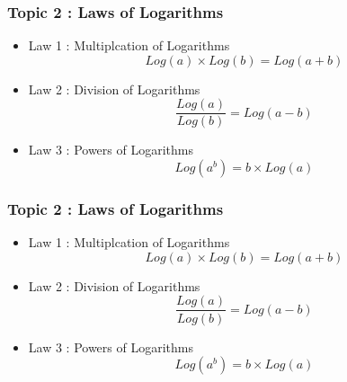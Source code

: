 \documentclass{beamer}
\begin{document}
\begin{frame}
	\frametitle{ Topic 2 : Laws of Logarithms}
	\Large
	\begin{itemize}
		\item Law 1 : Multiplcation of Logarithms
		\[ Log(a) \times Log(b) = Log(a+b) \]
		\item Law 2 : Division of Logarithms
		\[ \frac{Log(a)}{Log(b)} = Log(a-b) \]
		\item Law 3 : Powers of Logarithms
		\[ Log(a^b) = b \times Log(a) \]
	\end{itemize}
	
	
	
\end{frame}

\begin{frame}
	\frametitle{ Topic 2 : Laws of Logarithms}
	\Large
	\begin{itemize}
		\item Law 1 : Multiplcation of Logarithms
		\[ Log(a) \times Log(b) = Log(a+b) \]
		\item Law 2 : Division of Logarithms
		\[ \frac{Log(a)}{Log(b)} = Log(a-b) \]
		\item Law 3 : Powers of Logarithms
		\[ Log(a^b) = b \times Log(a) \]
	\end{itemize}
	
	
	
\end{frame}
\end{document}
